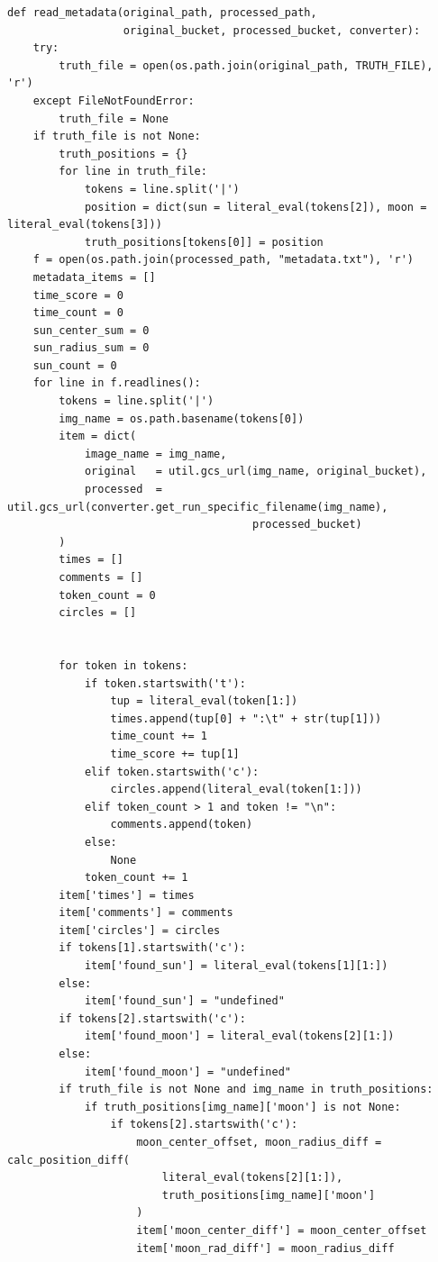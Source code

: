\documentclass[10pt, onecolumn, draftclsnofoot, letterpaper, compsoc]{IEEEtran}
\begin{document}
\begin{verbatim}
def read_metadata(original_path, processed_path,
                  original_bucket, processed_bucket, converter):
    try:
        truth_file = open(os.path.join(original_path, TRUTH_FILE), 'r')
    except FileNotFoundError:
        truth_file = None
    if truth_file is not None:
        truth_positions = {}
        for line in truth_file:
            tokens = line.split('|')
            position = dict(sun = literal_eval(tokens[2]), moon = literal_eval(tokens[3]))
            truth_positions[tokens[0]] = position
    f = open(os.path.join(processed_path, "metadata.txt"), 'r')
    metadata_items = []
    time_score = 0
    time_count = 0
    sun_center_sum = 0
    sun_radius_sum = 0
    sun_count = 0
    for line in f.readlines():
        tokens = line.split('|')
        img_name = os.path.basename(tokens[0])
        item = dict(
            image_name = img_name,
            original   = util.gcs_url(img_name, original_bucket),
            processed  = util.gcs_url(converter.get_run_specific_filename(img_name),
                                      processed_bucket)
        )
        times = []
        comments = []
        token_count = 0
        circles = []


        for token in tokens:
            if token.startswith('t'):
                tup = literal_eval(token[1:])
                times.append(tup[0] + ":\t" + str(tup[1]))
                time_count += 1
                time_score += tup[1]
            elif token.startswith('c'):
                circles.append(literal_eval(token[1:]))
            elif token_count > 1 and token != "\n":
                comments.append(token)
            else:
                None
            token_count += 1
        item['times'] = times
        item['comments'] = comments
        item['circles'] = circles
        if tokens[1].startswith('c'):
            item['found_sun'] = literal_eval(tokens[1][1:])
        else:
            item['found_sun'] = "undefined"
        if tokens[2].startswith('c'):
            item['found_moon'] = literal_eval(tokens[2][1:])
        else:
            item['found_moon'] = "undefined"
        if truth_file is not None and img_name in truth_positions:
            if truth_positions[img_name]['moon'] is not None:
                if tokens[2].startswith('c'):
                    moon_center_offset, moon_radius_diff = calc_position_diff(
                        literal_eval(tokens[2][1:]),
                        truth_positions[img_name]['moon']
                    )
                    item['moon_center_diff'] = moon_center_offset
                    item['moon_rad_diff'] = moon_radius_diff



\end{verbatim}
\end{document}
